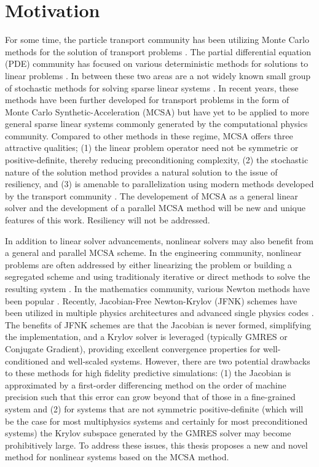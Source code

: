 \section{Motivation}
\label{sec:motivation}

For some time, the particle transport community has been utilizing
Monte Carlo methods for the solution of transport problems
\citep{lewis_1993}. The partial differential equation (PDE) community
has focused on various deterministic methods for solutions to linear
problems \citep{saad_2003, kelley_1995}. In between these two areas
are a not widely known small group of stochastic methods for solving
sparse linear systems \citep{hammersley_1964, halton_1962,
  halton_1994}. In recent years, these methods have been further
developed for transport problems in the form of Monte Carlo
Synthetic-Acceleration (MCSA) \citep{evans_2003, evans_2009} but have
yet to be applied to more general sparse linear systems commonly
generated by the computational physics community. Compared to other
methods in these regime, MCSA offers three attractive qualities; (1)
the linear problem operator need not be symmetric or
positive-definite, thereby reducing preconditioning complexity, (2)
the stochastic nature of the solution method provides a natural
solution to the issue of resiliency, and (3) is amenable to
parallelization using modern methods developed by the transport
community \citep{wagner_2011}. The developement of MCSA as a general
linear solver and the development of a parallel MCSA method will be
new and unique features of this work. Resiliency will not be
addressed.

In addition to linear solver advancements, nonlinear solvers may also
benefit from a general and parallel MCSA scheme. In the engineering
community, nonlinear problems are often addressed by either
linearizing the problem or building a segregated scheme and using
traditionaly iterative or direct methods to solve the resulting
system \citep{tannehill_1997}. In the mathematics community, various
Newton methods have been popular \citep{kelley_1995}. Recently,
Jacobian-Free Newton-Krylov (JFNK) schemes \citep{knoll_2004} have
been utilized in multiple physics architectures and advanced single
physics codes \citep{gaston_2009}. The benefits of JFNK schemes are
that the Jacobian is never formed, simplifying the implementation, and
a Krylov solver is leveraged (typically GMRES or Conjugate Gradient),
providing excellent convergence properties for well-conditioned and
well-scaled systems. However, there are two potential drawbacks to
these methods for high fidelity predictive simulations: (1) the
Jacobian is approximated by a first-order differencing method on the
order of machine precision such that this error can grow beyond that
of those in a fine-grained system and (2) for systems that are not
symmetric positive-definite (which will be the case for most
multiphysics systems and certainly for most preconditioned systems)
the Krylov subspace generated by the GMRES solver may become
prohibitively large. To address these issues, this thesis proposes a
new and novel method for nonlinear systems based on the MCSA method.

